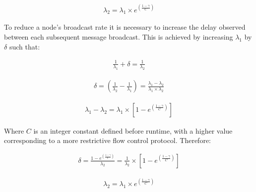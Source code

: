       \begin{equation*}
		     \begin{aligned}
		         \lambda_2 = \lambda_1 \times e ^{ ({\frac{1-\gamma}{C}})}
		     \end{aligned}
    \end{equation*} 
    
    To reduce a node's broadcast rate it is necessary to increase the delay observed between each subsequent message broadcast.  This is achieved by increasing $\lambda_1$ by $\delta$ such that:
    
    \begin{equation} \label{eq:rate_plus_delta}
		     \begin{aligned}
		         \frac{1}{\lambda_1} + \delta = \frac{1}{\lambda_2}
		     \end{aligned}
    \end{equation} 
    
    \begin{equation}
		     \begin{aligned}
		         \delta = (\frac{1}{\lambda_2} - \frac{1}{\lambda_1}) = \frac{\lambda_1 - \lambda_2}{\lambda_1 \times \lambda_2}
		     \end{aligned}
    \end{equation} 
        
    \begin{equation}
		     \begin{aligned}
		         \lambda_1 - \lambda_2 = \lambda_1 \times [1 - e ^{ ({\frac{1-\gamma}{C}})}]
		     \end{aligned}
    \end{equation} 
    
    Where $C$ is an integer constant defined before runtime, with a higher value corresponding to a more restrictive flow control protocol.  
    Therefore:
    
    \begin{equation}
		     \begin{aligned}
		         \delta = \frac{1 - e ^{ ({\frac{1-\gamma}{C}})}}{\lambda_2} = \frac{1}{\lambda_2} \times [1 - e ^{ ({\frac{1-\gamma}{C}})}]
		     \end{aligned}
    \end{equation}
    
    \begin{equation}
		     \begin{aligned}
		         \lambda_2 = \lambda_1 \times e ^{ ({\frac{1-\gamma}{C}})}
		     \end{aligned}
    \end{equation}     
    
